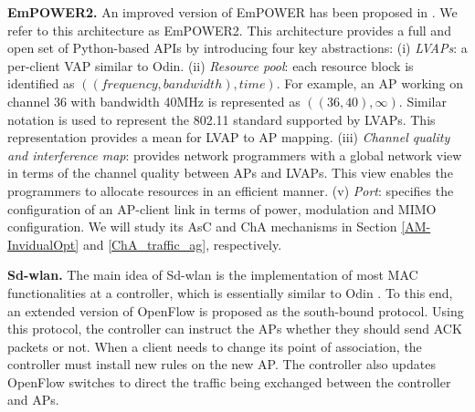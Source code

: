 \textbf{EmPOWER2.}
\label{empower2_arch}
An improved version of EmPOWER has been proposed in \cite{Primitives,EmPOWER-src}.
We refer to this architecture as EmPOWER2.
This architecture provides a full and open set of Python-based APIs by introducing four key abstractions:
(i) \textit{LVAPs}: a per-client VAP similar to Odin.
(ii) \textit{Resource pool}: each resource block is identified as $( (frequency, bandwidth), time)$. For example, an AP working on channel 36 with bandwidth 40MHz is represented as $( (36, 40), \infty)$. 
Similar notation is used to represent the 802.11 standard supported by LVAPs. This representation provides a mean for LVAP to AP mapping. 
(iii) \textit{Channel quality and interference map}: provides network programmers with a global network view in terms of the channel quality between APs and LVAPs. This view enables the programmers to allocate resources in an efficient manner.
(v) \textit{Port}: specifies the configuration of an AP-client link in terms of power, modulation and MIMO configuration.
We will study its AsC and ChA mechanisms in Section \ref{AM-InvidualOpt} and \ref{ChA_traffic_ag}, respectively. 




\textbf{Sd-wlan.}
\label{SDWLANarch}
The main idea of Sd-wlan \cite{SDWLAN,SDWLAN2} is the implementation of most MAC functionalities at a controller, which is essentially similar to Odin \cite{Odin2}. 
To this end, an extended version of OpenFlow is proposed as the south-bound protocol. 
Using this protocol, the controller can instruct the APs whether they should send ACK packets or not.
When a client needs to change its point of association, the controller must install new rules on the new AP.
The controller also updates OpenFlow switches to direct the traffic being exchanged between the controller and APs.


